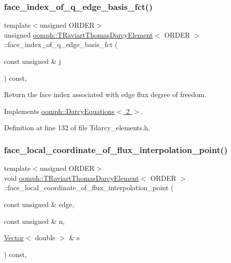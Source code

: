 \subsubsection{\texorpdfstring{face\+\_\+index\+\_\+of\+\_\+q\+\_\+edge\+\_\+basis\+\_\+fct()}{face\_index\_of\_q\_edge\_basis\_fct()}}
{\footnotesize\ttfamily template$<$unsigned O\+R\+D\+ER$>$ \\
unsigned \hyperlink{classoomph_1_1TRaviartThomasDarcyElement}{oomph\+::\+T\+Raviart\+Thomas\+Darcy\+Element}$<$ O\+R\+D\+ER $>$\+::face\+\_\+index\+\_\+of\+\_\+q\+\_\+edge\+\_\+basis\+\_\+fct (\begin{DoxyParamCaption}\item[{const unsigned \&}]{j }\end{DoxyParamCaption}) const\hspace{0.3cm}{\ttfamily [inline]}, {\ttfamily [virtual]}}



Return the face index associated with edge flux degree of freedom. 



Implements \hyperlink{classoomph_1_1DarcyEquations_a7800978eb25207be715250ad446150c5}{oomph\+::\+Darcy\+Equations$<$ 2 $>$}.



Definition at line 132 of file Tdarcy\+\_\+elements.\+h.

\mbox{\label{classoomph_1_1TRaviartThomasDarcyElement_a21436d43ed647f9c0aeb56fe776d63cd}} 
\subsubsection{\texorpdfstring{face\+\_\+local\+\_\+coordinate\+\_\+of\+\_\+flux\+\_\+interpolation\+\_\+point()}{face\_local\_coordinate\_of\_flux\_interpolation\_point()}}
{\footnotesize\ttfamily template$<$unsigned O\+R\+D\+ER$>$ \\
void \hyperlink{classoomph_1_1TRaviartThomasDarcyElement}{oomph\+::\+T\+Raviart\+Thomas\+Darcy\+Element}$<$ O\+R\+D\+ER $>$\+::face\+\_\+local\+\_\+coordinate\+\_\+of\+\_\+flux\+\_\+interpolation\+\_\+point (\begin{DoxyParamCaption}\item[{const unsigned \&}]{edge,  }\item[{const unsigned \&}]{n,  }\item[{\hyperlink{classoomph_1_1Vector}{Vector}$<$ double $>$ \&}]{s }\end{DoxyParamCaption}) const\hspace{0.3cm}{\ttfamily [inline]}, {\ttfamily [virtual]}}



